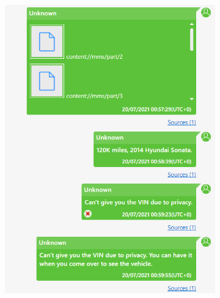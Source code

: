\documentclass[12pt]{article}
\begin{document}
\begin{figure}[!ht]
\begin{subfigure}[b]{0.3\textwidth}
        \includegraphics[width=\textwidth]{images/ss4.png}
        \caption{}
    \end{subfigure}
    \hspace{2 pt}
    \begin{subfigure}[b]{0.3\textwidth}
        \centering

\end{subfigure}
\end{figure}
\end{document}
